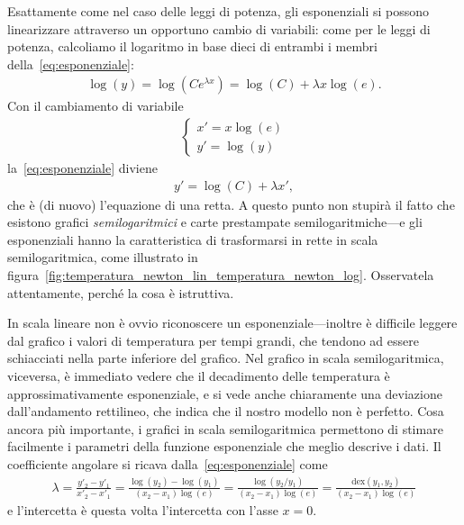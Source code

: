Esattamente come nel caso delle leggi di potenza, gli esponenziali si possono
linearizzare attraverso un opportuno cambio di variabili: come per le leggi di
potenza, calcoliamo il logaritmo in base dieci di entrambi i membri
della~\eqref{eq:esponenziale}:
\begin{align*}
  \log(y) = \log(Ce^{\lambda x}) = \log(C) + \lambda x\log(e).
\end{align*}
Con il cambiamento di variabile
\begin{align*}
  \begin{cases}
    x' = x \log(e)\\
    y' = \log(y)
  \end{cases}
\end{align*}
la~\eqref{eq:esponenziale} diviene
\begin{align}
  y' = \log(C) + \lambda x',
\end{align}
che è (di nuovo) l'equazione di una retta. A questo punto non stupirà il fatto
che esistono grafici \emph{semilogaritmici} e carte prestampate semilogaritmiche---e
gli esponenziali hanno la caratteristica di trasformarsi in rette in scala semilogaritmica,
come illustrato in figura~\ref{fig:temperatura_newton_lin_temperatura_newton_log}.
Osservatela attentamente, perché la cosa è istruttiva.


In scala lineare non è ovvio riconoscere un esponenziale---inoltre è difficile
leggere dal grafico i valori di temperatura per tempi grandi, che tendono ad essere
schiacciati nella parte inferiore del grafico. Nel grafico in scala semilogaritmica,
viceversa, è immediato vedere che il decadimento delle temperatura è approssimativamente
esponenziale, e si vede anche chiaramente una deviazione dall'andamento rettilineo,
che indica che il nostro modello non è perfetto. Cosa ancora più importante,
i grafici in scala semilogaritmica permettono di stimare facilmente i parametri
della funzione esponenziale che meglio descrive i dati.
Il coefficiente angolare si ricava dalla~\eqref{eq:esponenziale} come
\begin{align}\label{eq:fit_grafico_semilog}
  \lambda = \frac{y'_2 - y'_1}{x'_2 - x'_1} =
  \frac{\log(y_2) - \log(y_1)}{(x_2 - x_1)\log(e)} =
  \frac{\log(y_2/y_1)}{(x_2 - x_1)\log(e)} =
  \frac{\text{dex}(y_1, y_2)}{(x_2 - x_1)\log(e)}
\end{align}
e l'intercetta è questa volta l'intercetta con l'asse $x = 0$.

